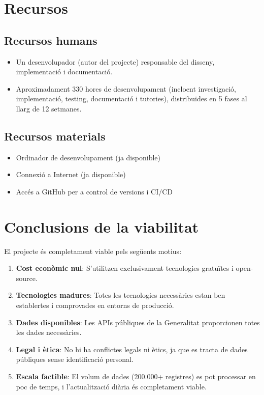 
\section{Recursos}

\subsection{Recursos humans}

\begin{itemize}
    \item Un desenvolupador (autor del projecte) responsable del disseny, implementació i documentació.
    \item Aproximadament 330 hores de desenvolupament (incloent investigació, implementació, testing, documentació i tutories), distribuïdes en 5 fases al llarg de 12 setmanes.
\end{itemize}

\subsection{Recursos materials}

\begin{itemize}
    \item Ordinador de desenvolupament (ja disponible)
    \item Connexió a Internet (ja disponible)
    \item Accés a GitHub per a control de versions i CI/CD
\end{itemize}


\section{Conclusions de la viabilitat}

El projecte és completament viable pels següents motius:

\begin{enumerate}
    \item \textbf{Cost econòmic nul}: S'utilitzen exclusivament tecnologies gratuïtes i open-source.
    \item \textbf{Tecnologies madures}: Totes les tecnologies necessàries estan ben establertes i comprovades en entorns de producció.
    \item \textbf{Dades disponibles}: Les APIs públiques de la Generalitat proporcionen totes les dades necessàries.
    \item \textbf{Legal i ètica}: No hi ha conflictes legals ni ètics, ja que es tracta de dades públiques sense identificació personal.
    \item \textbf{Escala factible}: El volum de dades (200.000+ registres) es pot processar en poc de temps, i l'actualització diària és completament viable.
\end{enumerate}

